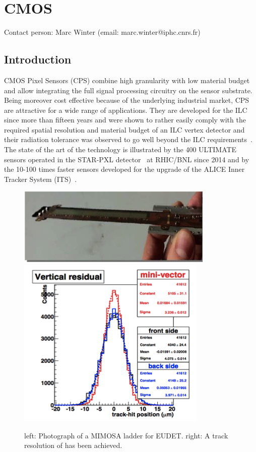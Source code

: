 \section{CMOS}
Contact person: Marc Winter (email: marc.winter@iphc.cnrs.fr)
\subsection{Introduction}
CMOS Pixel Sensors (CPS) combine high granularity with low material
budget and allow integrating the full signal processing circuitry on
the sensor substrate. Being moreover cost effective because of the
underlying industrial market, CPS are attractive for a wide range of
applications. They are developed for the ILC since more than fifteen
years and were shown to rather easily comply with the required spatial
resolution and material budget of an ILC vertex detector and their
radiation tolerance was observed to go well beyond the ILC requirements~\cite{Behnke:2013lya}. The state of the art of the technology is illustrated
by the 400 ULTIMATE sensors operated in the STAR-PXL detector~\cite{Greiner201168}
at RHIC/BNL since 2014 and by the 10-100 times faster
sensors developed for the upgrade of the ALICE Inner Tracker System
(ITS)~\cite{0954-3899-41-8-087002}.

\begin{figure}[hb]
	\centering
	\includegraphics[width=.5\linewidth]{VertexDetector/CMOS/Ladder}
	\includegraphics[width=.34\linewidth]{VertexDetector/CMOS/trackResolution.png}
	\caption{left: Photograph of a MIMOSA ladder for EUDET. right: A track resolution of \unit[3]{\micron} has been achieved.}
	\label{fig:VertexDetector:CMOS}
\end{figure}

